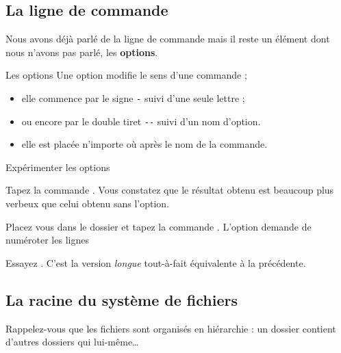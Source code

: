 \documentclass[a4paper,11pt]{style-esi/td}
\begin{document}
	\subsection{La ligne de commande}
	
		Nous avons déjà parlé de la ligne de commande 
		mais il reste un élément dont nous n'avons pas parlé, les \textbf{options}.

		\begin{theorie}{Les options}
			Une option modifie le sens d'une commande ;
			\begin{itemize}
			\item elle commence par le signe \texttt{-} suivi d'une seule lettre ;
			\item ou encore par le double tiret \texttt{-{}-} suivi d'un nom d'option.
			\item elle est placée n'importe où après le nom de la commande.   
			\end{itemize}
		\end{theorie}		

\newpage

	\begin{Tutoriel}{Expérimenter les options}		
		\vspace{-1em}
		\begin{steps}
		\item Tapez la commande . 
			Vous constatez que le résultat obtenu est beaucoup plus verbeux 
			que celui obtenu sans l'option.
		\item Placez vous dans le dossier  et 
			tapez la commande . 
			L'option demande de numéroter les lignes 
		\item Essayez . 
			C'est la version \textit{longue} tout-à-fait équivalente à la précédente.
		\end{steps}
	\end{Tutoriel}

	\subsection{La racine du système de fichiers}

		Rappelez-vous que les fichiers sont organisés en hiérarchie :
		un dossier contient d'autres dossiers qui lui-même\dots
\end{document}
